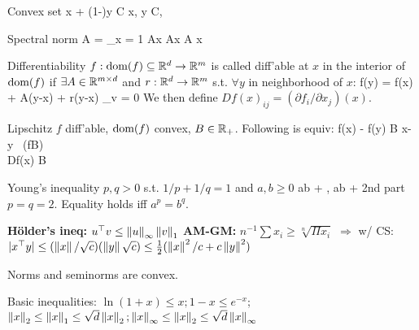 \begin{smallmathbox}
    {Convex set}
    {\lambda x + (1-\lambda)y \in C \quad \forall x, y \in C, \lambda \in [0,1]}
\end{smallmathbox}

\begin{smallmathbox}
    {Spectral norm}
    {\lnorm A \rnorm = \max_{\lnorm x \rnorm = 1} \lnorm Ax \rnorm\newline{}\lnorm Ax \rnorm \leq \lnorm A \rnorm \lnorm x \rnorm}
\end{smallmathbox}

\begin{mathbox}
    {Differentiability}
    {$f: \operatorname*{\text{dom}}(f)\subseteq \mathbb{R}^d \to \mathbb{R}^m$ is called diff'able at $x$ in the interior of $\operatorname*{\text{dom}}(f)$ if $\exists A \in \mathbb{R}^{m \times d}$ and $r: \mathbb{R}^d \to \mathbb{R}^m$ s.t. $\forall y$ in neighborhood of $x$:}
    {f(y) = f(x) + A(y-x) + r(y-x)  \lim_{v}  = 0}
    {We then define $D f(x)_{ij} = (\partial f_i / \partial x_j) (x)$.}
\end{mathbox}

\begin{mathbox}
    {Lipschitz}
    {$f$ diff'able, $\operatorname*{\text{dom}}(f)$ convex, $B\in \mathbb{R}_+$. Following is equiv:}
    {\lnorm f(x) - f(y) \rnorm \leq B \lnorm x-y \rnorm \ (fB) \\
    \lnorm Df(x) \rnorm \leq B \ }
    {}
\end{mathbox}

\begin{mathbox}
    {Young's inequality}
    {$p,q > 0$ s.t. $1/p + 1/q = 1$ and $a, b \geq 0$}
    {ab \leq {} + , \quad ab \leq {} + }
    {2nd part $p=q=2$. Equality holds iff $a^p = b^q$.}
\end{mathbox}

\textbf{Hölder's ineq: } $u^\top v \leq \left\lVert u \right\rVert_\infty \left\lVert v \right\rVert_1$ \textbf{AM-GM: } $n^{-1}\sum x_i \geq \sqrt[n]{\Pi x_i}$ $\Rightarrow$ w/ CS: $\vert x^\top y \vert \leq (\left\lVert x \right\rVert / \sqrt{c}) (\left\lVert y \right\rVert \sqrt{c}) \leq \frac{1}{2} (\left\lVert x \right\rVert^2 / c + c \left\lVert y \right\rVert^2)$

Norms and seminorms are convex.

Basic inequalities: $\ln(1+x) \leq x; 1-x \leq e^{-x}$; $\left\lVert x \right\rVert_2 \leq \left\lVert x \right\rVert_1 \leq \sqrt{d} \left\lVert x \right\rVert_2; \left\lVert x \right\rVert_\infty \leq \left\lVert x \right\rVert_2 \leq \sqrt{d} \left\lVert x \right\rVert_\infty$


